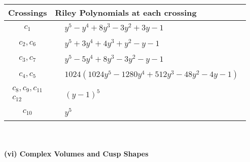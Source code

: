 \documentclass[1p]{elsarticle_modified}
\theoremstyle{definition}
\begin{document}
\begin{tabular}{m{50pt}|m{274pt}}
Crossings & \hspace{64pt}Riley Polynomials at each crossing \\
\hline $$\begin{aligned}c_{1}\end{aligned}$$&$\begin{aligned}
&y^5- y^4+8 y^3-3 y^2+3 y-1
\end{aligned}$\\
\hline $$\begin{aligned}c_{2},c_{6}\end{aligned}$$&$\begin{aligned}
&y^5+3 y^4+4 y^3+y^2- y-1
\end{aligned}$\\
\hline $$\begin{aligned}c_{3},c_{7}\end{aligned}$$&$\begin{aligned}
&y^5-5 y^4+8 y^3-3 y^2- y-1
\end{aligned}$\\
\hline $$\begin{aligned}c_{4},c_{5}\end{aligned}$$&$\begin{aligned}
&1024(1024 y^5-1280 y^4+512 y^3-48 y^2-4 y-1)
\end{aligned}$\\
\hline $$\begin{aligned}c_{8},c_{9},c_{11}\\c_{12}\end{aligned}$$&$\begin{aligned}
&(y-1)^5
\end{aligned}$\\
\hline $$\begin{aligned}c_{10}\end{aligned}$$&$\begin{aligned}
&y^5
\end{aligned}$\\
\hline
\end{tabular}\\~\\
\newpage\flushleft \textbf{(vi) Complex Volumes and Cusp Shapes}
\end{document}
